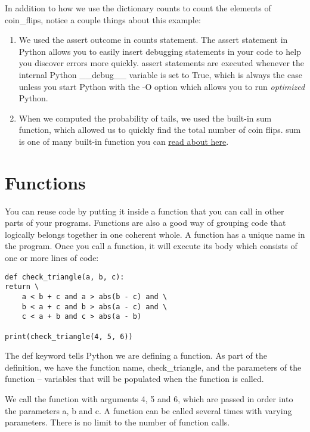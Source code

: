In addition to how we use the dictionary counts to count the elements of
coin\_flips, notice a couple things about this example:

\begin{enumerate}
\tightlist
\item
  We used the assert outcome in counts statement. The assert statement
  in Python allows you to easily insert debugging statements in your
  code to help you discover errors more quickly. assert statements are
  executed whenever the internal Python \_\_debug\_\_ variable is set to
  True, which is always the case unless you start Python with the -O
  option which allows you to run \emph{optimized} Python.
\item
  When we computed the probability of tails, we used the built-in sum
  function, which allowed us to quickly find the total number of coin
  flips. sum is one of many built-in function you can
  \href{https://docs.python.org/2/library/functions.html}{read about
  here}.
\end{enumerate}

\section{Functions}\label{functions}

You can reuse code by putting it inside a function that you can call in
other parts of your programs. Functions are also a good way of grouping
code that logically belongs together in one coherent whole. A function
has a unique name in the program. Once you call a function, it will
execute its body which consists of one or more lines of code:

\begin{verbatim}
def check_triangle(a, b, c):
return \
    a < b + c and a > abs(b - c) and \
    b < a + c and b > abs(a - c) and \
    c < a + b and c > abs(a - b)

print(check_triangle(4, 5, 6))
\end{verbatim}

The def keyword tells Python we are defining a function. As part of the
definition, we have the function name, check\_triangle, and the
parameters of the function -- variables that will be populated when the
function is called.

We call the function with arguments 4, 5 and 6, which are passed in
order into the parameters a, b and c. A function can be called several
times with varying parameters. There is no limit to the number of
function calls.

